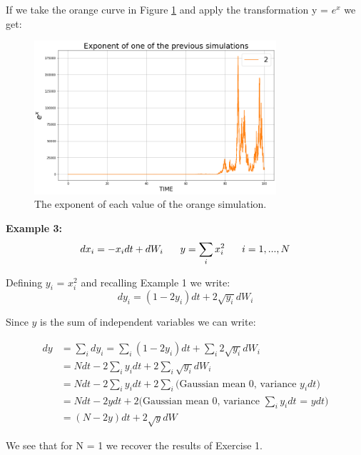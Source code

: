 If we take the orange curve in Figure \ref{Fig:SDE_x_2} and apply the transformation y = $e^x$ we get:
\begin{figure}[H]
  \centering
  \includegraphics[width=0.8\textwidth]{SDE/Figures/SDEy_2.png}
  \caption{The exponent of each value of the orange simulation.}
  \label{Fig:SDE_x_2}
\end{figure}

\textbf{Example 3:} \begin{equation}
    dx_i = -x_i dt + dW_i \hspace{6mm} y = \sum_i x_i^2 \hspace{6mm} i = 1, ..., N
    \label{SDE_x_3}
\end{equation}

Defining $y_i$ = $x_i^2$ and  recalling Example 1 we write:
\begin{equation}
    dy_i = (1-2y_i)dt + 2\sqrt{y_i}dW_i
\end{equation}

Since $y$ is the sum of independent variables we can write:

\begin{align}
        \nonumber dy &= \sum_i dy_i = \sum_i (1-2y_i)dt + \sum_i 2\sqrt{y_i}dW_i \\
        \nonumber &= Ndt - 2\sum_i y_i dt + 2 \sum_i \sqrt{y_i}dW_i\\
        \nonumber &= Ndt - 2\sum_i y_i dt + 2 \sum_i \text{(Gaussian mean 0, variance $y_idt$)}\\
        \nonumber &= Ndt - 2y dt + 2\text{(Gaussian mean 0, variance $\sum_i y_idt$ = $ydt$)}\\
                  &= (N -2y) dt + 2\sqrt{y}dW
    \end{align}
\label{SDE_y_3}

We see that for N = 1 we recover the results of Exercise 1. \\

